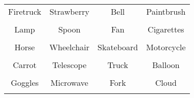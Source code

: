 \documentclass[12pt,a4paper]{article}
\begin{document}
\thispagestyle{empty}
\begin{table}[]
\centering
\Huge
\begin{tabular}{cccc}
 Firetruck& Strawberry& Bell& Paintbrush\\  & & & \\
 Lamp& Spoon& Fan& Cigarettes\\  & & & \\
 Horse& Wheelchair& Skateboard& Motorcycle\\  & & & \\
 Carrot& Telescope& Truck& Balloon\\  & & & \\
 Goggles& Microwave& Fork& Cloud\\  & & & \\
\end{tabular}
\end{table}
\end{document}
